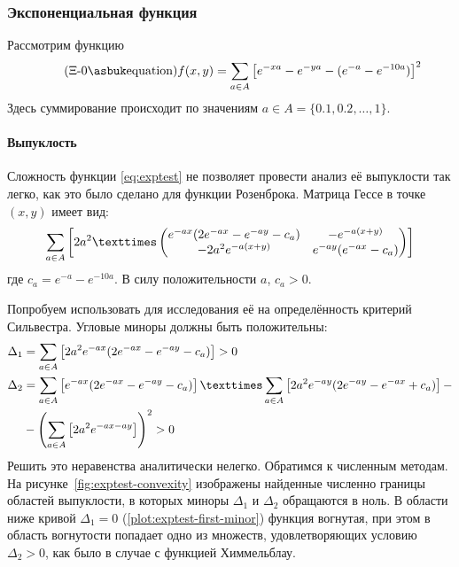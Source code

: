 \subsubsection{Экспоненциальная функция}
\label{sec:exptest}

Рассмотрим функцию
\begin{equation}
  \label{eq:exptest}
  \tag{$\Xi$-\theequation}
  f(x, y) = \suml_{a\in A}\left [
    e^{-xa}-e^{-ya}-(e^{-a}-e^{-10a})\right ]^2
\end{equation}
Здесь суммирование происходит по значениям $a \in A =\{0.1, 0.2, \dotsc, 1\}$.

\paragraph{Выпуклость}

Сложность функции \eqref{eq:exptest} не позволяет провести анализ её
выпуклости так легко, как это было сделано для функции Розенброка.
Матрица Гессе в точке $(x, y)$ имеет вид:
\begin{equation}
  \label{eq:exptest-hess}
  \suml_{a\in A}\left[2a^2×
  \begin{pmatrix}
    e^{-ax}(2e^{-ax}-e^{-ay}-c_a) & -e^{-a(x+y)} \\
    -2a^2e^{-a(x+y)} & e^{-ay}(e^{-ax}-c_a)
  \end{pmatrix}\right]
\end{equation}
где $c_a = e^{-a}-e^{-10a}$. В силу положительности $a$, $c_a>0$.

Попробуем использовать для исследования её на определённость критерий
Сильвестра. Угловые миноры должны быть положительны:
\begin{align*}
  \Delta_1 &= \suml_{a\in A}
  \left[ 2a^2e^{-ax}(2e^{-ax}-e^{-ay}-c_a) \right] > 0\\
  \Delta_2 &= \suml_{a\in A}
  \left[ e^{-ax}(2e^{-ax}-e^{-ay}-c_a) \right]×
  \suml_{a\in A}
  \left[ 2a^2e^{-ay}(2e^{-ay}-e^{-ax}+c_a) \right]-\\
  &-\left(\suml_{a\in A}
  \left[ 2a^2e^{-ax-ay} \right] \right)^2
  > 0
\end{align*}
Решить это неравенства аналитически нелегко. Обратимся к численным
методам. На рисунке \ref{fig:exptest-convexity} изображены найденные
численно границы областей выпуклости, в которых миноры $\Delta_1$ и
$\Delta_2$ обращаются в ноль. В области ниже кривой $\Delta_1=0$
(\ref{plot:exptest-first-minor}) функция вогнутая, при этом в область
вогнутости попадает одно из множеств, удовлетворяющих условию
$\Delta_2 > 0$, как было в случае с функцией Химмельблау.

